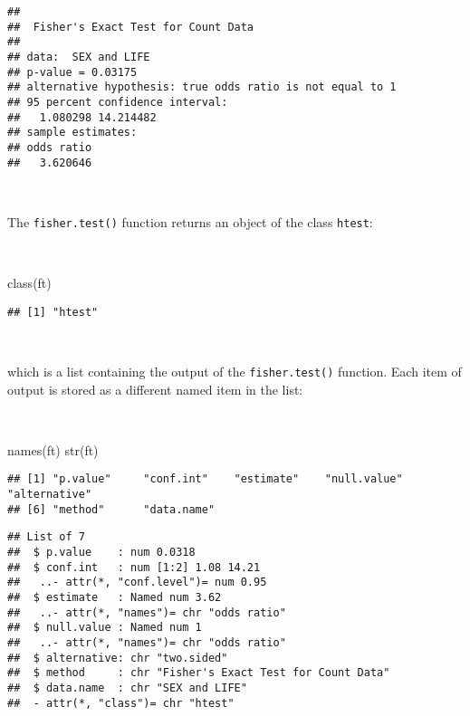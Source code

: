 \documentclass[
  12pt,
  a4paper]{book}
\newenvironment{Shaded}{\begin{snugshade}}{\end{snugshade}}
\newcommand{\FunctionTok}[1]{\textcolor[rgb]{0.00,0.00,0.00}{#1}}
\newcommand{\NormalTok}[1]{#1}
\begin{document}
\begin{verbatim}
## 
##  Fisher's Exact Test for Count Data
## 
## data:  SEX and LIFE
## p-value = 0.03175
## alternative hypothesis: true odds ratio is not equal to 1
## 95 percent confidence interval:
##   1.080298 14.214482
## sample estimates:
## odds ratio 
##   3.620646
\end{verbatim}

~

The \texttt{fisher.test()} function returns an object of the class \texttt{htest}:

~

\begin{Shaded}
\begin{Highlighting}[]
\FunctionTok{class}\NormalTok{(ft)}
\end{Highlighting}
\end{Shaded}

\begin{verbatim}
## [1] "htest"
\end{verbatim}

~

which is a list containing the output of the \texttt{fisher.test()} function. Each item of output is stored as a different named item in the list:

~

\begin{Shaded}
\begin{Highlighting}[]
\FunctionTok{names}\NormalTok{(ft)}
\FunctionTok{str}\NormalTok{(ft)}
\end{Highlighting}
\end{Shaded}

\begin{verbatim}
## [1] "p.value"     "conf.int"    "estimate"    "null.value"  "alternative"
## [6] "method"      "data.name"
\end{verbatim}

\begin{verbatim}
## List of 7
##  $ p.value    : num 0.0318
##  $ conf.int   : num [1:2] 1.08 14.21
##   ..- attr(*, "conf.level")= num 0.95
##  $ estimate   : Named num 3.62
##   ..- attr(*, "names")= chr "odds ratio"
##  $ null.value : Named num 1
##   ..- attr(*, "names")= chr "odds ratio"
##  $ alternative: chr "two.sided"
##  $ method     : chr "Fisher's Exact Test for Count Data"
##  $ data.name  : chr "SEX and LIFE"
##  - attr(*, "class")= chr "htest"
\end{verbatim}

~
\end{document}
